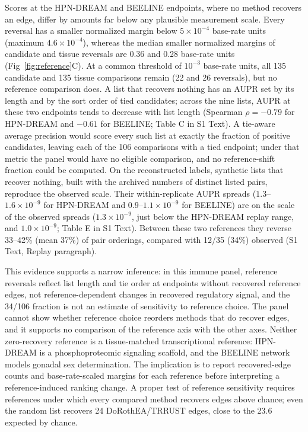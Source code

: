 \documentclass[10pt,letterpaper]{article}
\begin{document}
Scores at the HPN-DREAM and BEELINE endpoints, where no method recovers an edge, differ by amounts far below any plausible measurement scale. Every reversal has a smaller normalized margin below $5\times10^{-4}$ base-rate units (maximum $4.6\times10^{-4}$), whereas the median smaller normalized margins of candidate and tissue reversals are 0.36 and 0.28 base-rate units (Fig~\ref{fig:reference}C). At a common threshold of $10^{-3}$ base-rate units, all 135 candidate and 135 tissue comparisons remain (22 and 26 reversals), but no reference comparison does. A list that recovers nothing has an AUPR set by its length and by the sort order of tied candidates; across the nine lists, AUPR at these two endpoints tends to decrease with list length (Spearman $\rho=-0.79$ for HPN-DREAM and $-0.61$ for BEELINE; Table C in S1 Text). A tie-aware average precision would score every such list at exactly the fraction of positive candidates, leaving each of the 106 comparisons with a tied endpoint; under that metric the panel would have no eligible comparison, and no reference-shift fraction could be computed. On the reconstructed labels, synthetic lists that recover nothing, built with the archived numbers of distinct listed pairs, reproduce the observed scale. Their within-replicate AUPR spreads ($1.3$--$1.6\times10^{-9}$ for HPN-DREAM and $0.9$--$1.1\times10^{-9}$ for BEELINE) are on the scale of the observed spreads ($1.3\times10^{-9}$, just below the HPN-DREAM replay range, and $1.0\times10^{-9}$; Table E in S1 Text). Between these two references they reverse 33--42\% (mean 37\%) of pair orderings, compared with 12/35 (34\%) observed (S1 Text, Replay paragraph).

This evidence supports a narrow inference: in this immune panel, reference reversals reflect list length and tie order at endpoints without recovered reference edges, not reference-dependent changes in recovered regulatory signal, and the 34/106 fraction is not an estimate of sensitivity to reference choice. The panel cannot show whether reference choice reorders methods that do recover edges, and it supports no comparison of the reference axis with the other axes. Neither zero-recovery reference is a tissue-matched transcriptional reference: HPN-DREAM is a phosphoproteomic signaling scaffold, and the BEELINE network models gonadal sex determination. The implication is to report recovered-edge counts and base-rate-scaled margins for each reference before interpreting a reference-induced ranking change. A proper test of reference sensitivity requires references under which every compared method recovers edges above chance; even the random list recovers 24 DoRothEA/TRRUST edges, close to the 23.6 expected by chance.
\end{document}
